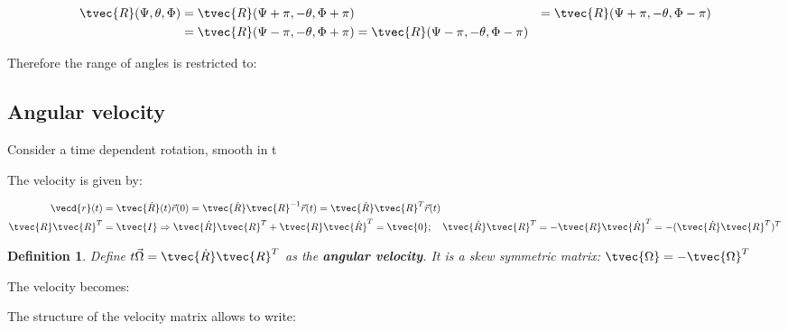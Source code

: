 \documentclass[10pt,a4paper]{scrartcl}
\newtheorem{define}{Definition}
\begin{document}
\begin{multicols*}{2}
\begin{small}
\begin{align*}
\tvec{R}(\Psi,\theta,\Phi)&=\tvec{R}(\Psi+\pi,-\theta,\Phi+\pi)&=\tvec{R}(\Psi+\pi,-\theta,\Phi-\pi)\\
&=\tvec{R}(\Psi-\pi,-\theta,\Phi+\pi)=\tvec{R}(\Psi-\pi,-\theta,\Phi-\pi)
\end{align*}
\end{small}

Therefore the range of angles is restricted to:

\important{$0\leq\Psi<2\pi;\ 0\leq\theta\leq\pi;\ 0\leq\Psi<2\pi$}

\subsection{Angular velocity}

Consider a time dependent rotation, smooth in t


The velocity is given by:

\begin{align*}
\vecd{r}(t)&=\tvec{\dot{R}}(t)\vec{r}(0)=\tvec{\dot{R}}\tvec{R}^{-1}\vec{r}(t)=\tvec{\dot{R}}\tvec{R}^T\vec{r}(t)\\
\tvec{R}\tvec{R}^T&=\tvec{I}\Rightarrow\tvec{\dot{R}}\tvec{R}^T+\tvec{R}\tvec{\dot{R}}^T=\tvec{0};\quad \tvec{\dot{R}}\tvec{R}^T=-\tvec{R}\tvec{\dot{R}}^T=-(\tvec{\dot{R}}\tvec{R}^T)^T
\end{align*}

\begin{define}
Define $t\vec{\Omega}=\tvec{\dot{R}}\tvec{R}^T$ as the \textbf{angular velocity}. It is a skew symmetric matrix: $\tvec{\Omega}=-\tvec{\Omega}^T$
\end{define}

The velocity becomes:


The structure of the velocity matrix allows to write:


\end{multicols*}
\end{document}
